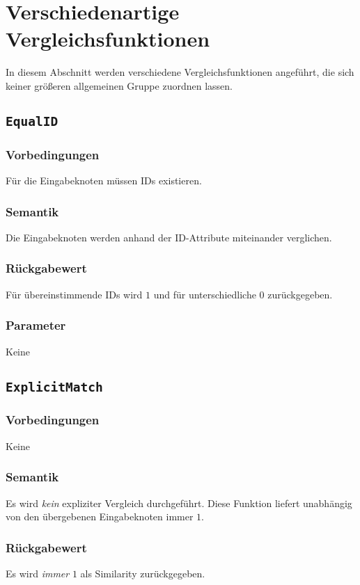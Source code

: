 %
%

\section{Verschiedenartige Vergleichsfunktionen}
\label{strct:spec:misc}
In diesem Abschnitt werden verschiedene Vergleichsfunktionen angeführt, die sich keiner größeren allgemeinen Gruppe zuordnen lassen.


%
%
\subsection{\texttt{EqualID}}
\subsubsection*{Vorbedingungen}
Für die Eingabeknoten müssen IDs existieren.
\subsubsection*{Semantik}
Die Eingabeknoten werden anhand der ID-Attribute miteinander verglichen.
\subsubsection*{Rückgabewert}
Für übereinstimmende IDs wird $1$ und für unterschiedliche $0$ zurückgegeben.
\subsubsection*{Parameter}
Keine


%
%
\subsection{\texttt{ExplicitMatch}}
\subsubsection*{Vorbedingungen}
Keine
\subsubsection*{Semantik}
Es wird \emph{kein} expliziter Vergleich durchgeführt. Diese Funktion liefert unabhängig von den übergebenen Eingabeknoten immer $1$.
\subsubsection*{Rückgabewert}
Es wird \emph{immer} $1$ als Similarity zurückgegeben.
